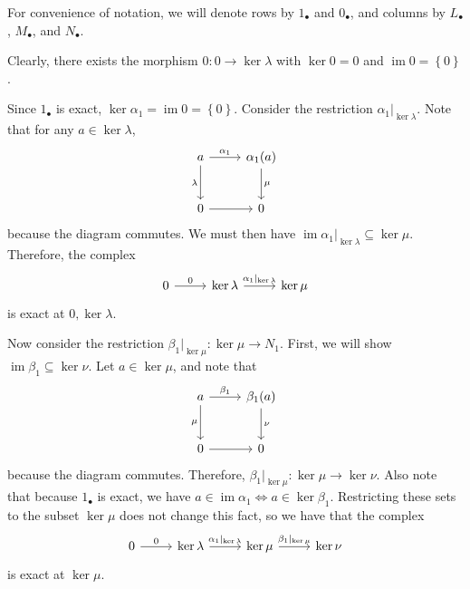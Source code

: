 \documentclass[11pt, letterpaper]{article}
\DeclareMathOperator{\im}{im}
\renewenvironment{proof}[1][]{\begin{replacementproof2}}{\end{replacementproof2}}
\begin{document}
\begin{proof}
	For convenience of notation, we will denote rows by $1_\bullet $ and $0_\bullet $, and columns by $L_\bullet $, $M_\bullet $, and $N_\bullet $.

Clearly, there exists the morphism $0 : 0 \to \ker \lambda $ with $\ker 0=0$ and $\im 0=\left\{ 0 \right\} $.

Since $1_\bullet $ is exact, $\ker \alpha_1=\im 0=\left\{ 0 \right\} $. Consider the restriction $\alpha_1|_{\ker \lambda }$. Note that for any $a\in \ker \lambda $,
\[\begin{tikzcd}[row sep = 2.5em, column sep = 2.5em]
	a\arrow[r, "\alpha_1"]\arrow[d, "\lambda "']&\alpha_1(a)\arrow[d, "\mu "]\\
	0\arrow[r]&0
\end{tikzcd}\]
because the diagram commutes. We must then have $\im \alpha_1|_{\ker \lambda }\subseteq \ker \mu $. Therefore, the complex
\[\begin{tikzcd}[row sep = 2.5em, column sep = 2.5em]
	0\arrow[r, "0"]&\ker \lambda \arrow[r, "\alpha_1|_{\ker \lambda }"]&\ker \mu 
\end{tikzcd}\]
is exact at $0,\ker \lambda $.

Now consider the restriction $\beta _1 |_{\ker \mu }: \ker \mu  \to N_1$. First, we will show $\im \beta_1\subseteq \ker \nu $. Let $a\in \ker \mu $, and note that
\[\begin{tikzcd}[row sep = 2.5em, column sep = 2.5em]
	a\arrow[r, "\beta_1"]\arrow[d, "\mu "']&\beta_1(a)\arrow[d, "\nu "]\\
	0\arrow[r]&0
\end{tikzcd}\]
because the diagram commutes. Therefore, $\beta_1|_{\ker \mu }: \ker \mu  \to \ker \nu $. Also note that because $1_\bullet $ is exact, we have $a\in \im \alpha_1 \iff a\in \ker \beta_1$. Restricting these sets to the subset $\ker \mu $ does not change this fact, so we have that the complex
\[\begin{tikzcd}[row sep = 2.5em, column sep = 2.5em]
	0\arrow[r, "0"]&\ker \lambda\arrow[r, "\alpha_1|_{\ker \lambda }"]&\ker \mu \arrow[r, "\beta_1|_{\ker \mu }"]&\ker \nu 
\end{tikzcd}\]
is exact at $\ker \mu $.


\end{proof}
\end{document}
